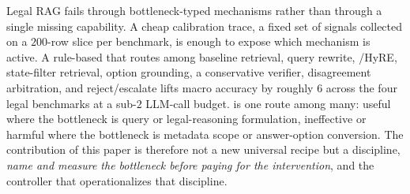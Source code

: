 Legal RAG fails through bottleneck-typed mechanisms rather than through a
single missing capability. A cheap calibration trace, a fixed set of
signals collected on a $200$-row slice per benchmark, is enough to expose
which mechanism is active. A rule-based \controller{} that routes among
baseline retrieval, query rewrite, \hyre{}/HyRE,
state-filter retrieval, option grounding, a conservative verifier,
disagreement arbitration, and reject/escalate lifts macro accuracy by
roughly $6$\pp{} across the four legal benchmarks at a sub-$2$ LLM-call
budget. \hyre{} is one route among many: useful where the
bottleneck is query or legal-reasoning formulation, ineffective or harmful
where the bottleneck is metadata scope or answer-option conversion. The
contribution of this paper is therefore not a new universal recipe but a
discipline, \emph{name and measure the bottleneck before paying for the
intervention}, and the \framework{} controller that operationalizes that
discipline.

